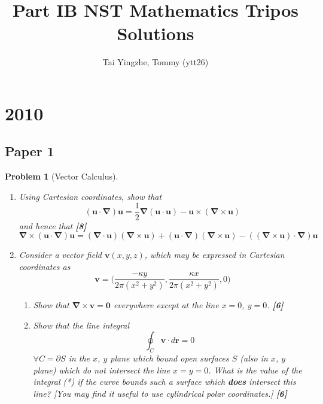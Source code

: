 \documentclass[a4paper]{article}
\title{\textbf{Part IB NST Mathematics Tripos Solutions}}
\author{Tai Yingzhe, Tommy (ytt26)}
\date{}
\theoremstyle{new}
\newtheorem{qns}{Problem}[section]
\begin{document}
\maketitle
\tableofcontents
\newpage

\section{2010}
\subsection{Paper 1}
\begin{qns}[Vector Calculus]\leavevmode
\begin{enumerate}[label=(\alph*)]
    \item Using Cartesian coordinates, show that
$$(\mathbf{u}\cdot\boldsymbol{\nabla})\mathbf{u}=\frac{1}{2}\boldsymbol{\nabla}(\mathbf{u}\cdot\mathbf{u})-\mathbf{u}\times(\boldsymbol{\nabla}\times\mathbf{u})$$
and hence that \hfill
\textbf{[8]}
$$\boldsymbol{\nabla}\times(\mathbf{u}\cdot\boldsymbol{\nabla})\mathbf{u}=(\boldsymbol{\nabla}\cdot\mathbf{u})(\boldsymbol{\nabla}\times\mathbf{u})+(\mathbf{u}\cdot\boldsymbol{\nabla})(\boldsymbol{\nabla}\times\mathbf{u})-((\boldsymbol{\nabla}\times\mathbf{u})\cdot\boldsymbol{\nabla})\mathbf{u}$$
\item  Consider a vector field $\mathbf{v}(x,y,z)$, which may be expressed in Cartesian coordinates as 
$$\mathbf{v}=\bigg(\frac{-\kappa y}{2\pi(x^2+y^2)},\frac{\kappa x}{2\pi(x^2+y^2)},0\bigg)$$
\begin{enumerate}[label=(\roman*)]
    \item Show that $\boldsymbol{\nabla}\times\mathbf{v}=\boldsymbol{0}$ everywhere except at the line $x=0$, $y=0$.\hfill
\textbf{[6]}
\item Show that the line integral
\begin{equation}
\oint_C\mathbf{v}\cdot d\mathbf{r}=0\tag{*}
\end{equation}
$\forall C=\partial S$ in the $x$, $y$ plane which bound open surfaces $S$ (also in $x$, $y$ plane) which do not intersect the line $x=y=0$. What is the value of the integral (*) if the curve bounds such a surface which \textbf{does} intersect this line? [You may find it useful to use cylindrical polar coordinates.]
\hfill
\textbf{[6]}
\end{enumerate}
\end{enumerate}
\end{qns}
\end{document}
